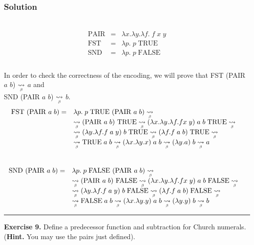 \documentclass{article}
\newcommand\stcarrow[2]{%
    \mathrel{\stackunder[2pt]{\stackon[4pt]{$\rightsquigarrow$}{$\scriptscriptstyle#1$}}{%
            $\scriptscriptstyle#2$}}}
\newcommand{\br}[1]{\stcarrow{}{\beta}#1}
\newcommand{\lm}[1]{\lambda #1 .}
\newcommand{\qed}{\begin{flushright}\rule{0.7em}{0.7em}\end{flushright}}
\begin{document}
\subsubsection*{Solution} \\
\begin{equation*}
\begin{array}{lll}
      \text{PAIR} & =  & \lm{x} \lm{y}\lm{f}\;  f \; x \; y  \\
      \text{FST} & = &  \lm{p} \; p \; \text{TRUE}\\
      \text{SND} & = &  \lm{p} \; p \; \text{FALSE}\\
\end{array}
\end{equation*}\\
In order to check the correctness of the encoding, we will prove that  FST (PAIR $a$ $b$) $\br{}$ $a$ and\\ SND (PAIR $a$ $b$) $\br{}$ $b$.
\begin{equation*}
\begin{array}{lll}
      \text{FST (PAIR } a \; b \text{)} =   & \lm{p} \; p \; \text{TRUE (PAIR } a \; b \text{)} \br{} & \\
        & \br{\text{(PAIR } a \; b \text{) TRUE}} \br{(\lm{x} \lm{y} \lm{f} f x\;y)\; a \;  b \; \text{TRUE}} \br{} &\\
        & \br{(\lm{y} \lm{f} f \;a\; y)\; b \; \text{TRUE}} \br{(\lm{f} f \;a\; b) \; \text{TRUE}} \br{} & \\
        & \br{\text{TRUE} \;a\; b} \br{(\lm{x} \lm{y} x) \;a \;b} \br{(\lm{y} a) \;b} \br{a} & 
\end{array}
\end{equation*}\\
\begin{equation*}
\begin{array}{lll}
      \text{SND (PAIR } a \; b \text{)} =   & \lm{p} \; p \; \text{FALSE (PAIR } a \; b \text{)} \br{} & \\
        & \br{\text{(PAIR } a \; b \text{) FALSE}} \br{(\lm{x} \lm{y} \lm{f} f x\;y)\; a \;  b \; \text{FALSE}} \br{} &\\
        & \br{(\lm{y} \lm{f} f \;a\; y)\; b \; \text{FALSE}} \br{(\lm{f} f \;a\; b) \; \text{FALSE}} \br{} & \\
        & \br{\text{FALSE} \;a\; b} \br{(\lm{x} \lm{y} y) \;a \;b} \br{(\lm{y} y) \;b} \br{b} & 
\end{array}
\end{equation*}
\qed
\textbf{Exercise 9.} Define a predecessor function and subtraction for Church numerals. (\textbf{Hint.} You may use the pairs just defined).
\end{document}
